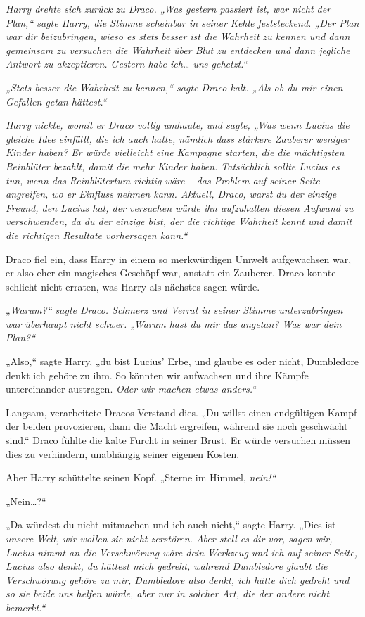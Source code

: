 {\emph{Harry drehte sich zurück zu Draco. „Was gestern passiert ist, war nicht der Plan,“ sagte Harry, die Stimme scheinbar in seiner Kehle feststeckend. „Der Plan war dir beizubringen, wieso es stets besser ist die Wahrheit zu kennen und dann gemeinsam zu versuchen die Wahrheit über Blut zu entdecken und dann jegliche Antwort zu akzeptieren. Gestern habe ich… uns gehetzt.“}

\emph{„Stets besser die Wahrheit zu kennen,“ sagte Draco kalt. „Als ob du mir einen Gefallen getan hättest.“}

\emph{Harry nickte, womit er Draco vollig umhaute, und sagte, „Was wenn Lucius die gleiche Idee einfällt, die ich auch hatte, nämlich dass stärkere Zauberer weniger Kinder haben? Er würde vielleicht eine Kampagne starten, die die mächtigsten Reinblüter bezahlt, damit die mehr Kinder haben. Tatsächlich sollte Lucius es tun, wenn das Reinblütertum richtig wäre -- das Problem auf seiner Seite angreifen, wo er Einfluss nehmen kann. Aktuell, Draco, warst du der einzige Freund, den Lucius hat, der versuchen würde ihn aufzuhalten diesen Aufwand zu verschwenden, da du der einzige bist, der die richtige Wahrheit kennt und damit die richtigen Resultate vorhersagen kann.“}

Draco fiel ein, dass Harry in einem so merkwürdigen Umwelt aufgewachsen war, er also eher ein magisches Geschöpf war, anstatt ein Zauberer. Draco konnte schlicht nicht erraten, was Harry als nächstes sagen würde.

„\emph{Warum?“ sagte Draco. Schmerz und Verrat in seiner Stimme unterzubringen war überhaupt nicht schwer. „Warum \emph{hast} du mir das angetan? Was \emph{war} dein Plan?“}

„Also,“ sagte Harry, „du bist Lucius' Erbe, und glaube es oder nicht, Dumbledore denkt ich gehöre zu ihm. So könnten wir aufwachsen und ihre Kämpfe untereinander austragen. \emph{Oder wir machen etwas anders.“}

Langsam, verarbeitete Dracos Verstand dies. „Du willst einen endgültigen Kampf der beiden provozieren, dann die Macht ergreifen, während sie noch geschwächt sind.“ Draco fühlte die kalte Furcht in seiner Brust. Er würde versuchen müssen dies zu verhindern, unabhängig seiner eigenen Kosten.

Aber Harry schüttelte seinen Kopf. „Sterne im Himmel, \emph{nein!“}

„Nein…?“

„Da würdest du nicht mitmachen und ich auch nicht,“ sagte Harry. „Dies ist \emph{unsere Welt, wir wollen sie nicht zerstören. Aber stell es dir vor, sagen wir, Lucius nimmt an die Verschwörung wäre dein Werkzeug und ich auf seiner Seite, Lucius also denkt, du hättest mich gedreht, während Dumbledore glaubt die Verschwörung gehöre zu mir, Dumbledore also denkt, ich hätte dich gedreht und so sie beide uns helfen würde, aber nur in solcher Art, die der andere nicht bemerkt.“}

}
